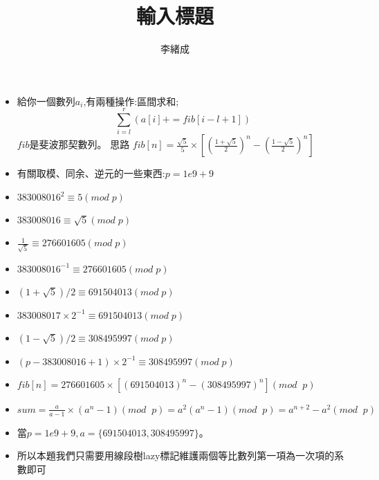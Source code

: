 \documentclass[a4paper, 12pt]{article}
\title{輸入標題}
\author{李緒成}
\begin{document}
    \begin{itemize}
        \item 給你一個數列$a_i$,有兩種操作:區間求和;
        $$\sum_{i=l}^{r}(a[i]+=fib[i-l+1])$$\(fib\)是斐波那契數列。
        思路
        \(fib[n] = \frac{\sqrt5}{5}\times [(\frac{1+\sqrt5}{2})^n-(\frac{1-\sqrt5}{2})^n]\)
        
        \item 有關取模、同余、逆元的一些東西:\(p = 1e9 + 9\)
        \item \(383008016^2 \equiv 5 (mod\;p)\)
        \item \(383008016 \equiv \sqrt5 (mod\;p)\)
        \item \(\frac{1}{\sqrt5} \equiv 276601605(mod\;p)\)
        \item \(383008016^{-1} \equiv 276601605(mod\;p)\)
        \item \((1+\sqrt5)/2 \equiv 691504013(mod\;p)\)
        \item \(383008017\times 2^{-1} \equiv 691504013(mod\;p)\)
        \item \((1-\sqrt5)/2 \equiv 308495997(mod\;p)\)
        \item \((p-383008016+1)\times 2^{-1} \equiv 308495997(mod\;p)\)
        
        \item \(fib[n] = 276601605\times [(691504013)^n-(308495997)^n] (mod\;\;p)\)
        \item \(sum = \frac{a}{a-1} \times (a^n - 1) (mod\;\;p) = a^2(a^n-1)(mod\;\;p)=a^{n+2}-a^2(mod\;\;p)\)
        \item 當\(p=1e9+9, a = \{691504013, 308495997\}\)。
        \item 所以本題我們只需要用線段樹lazy標記維護兩個等比數列第一項為一次項的系數即可
    \end{itemize}
\end{document}
